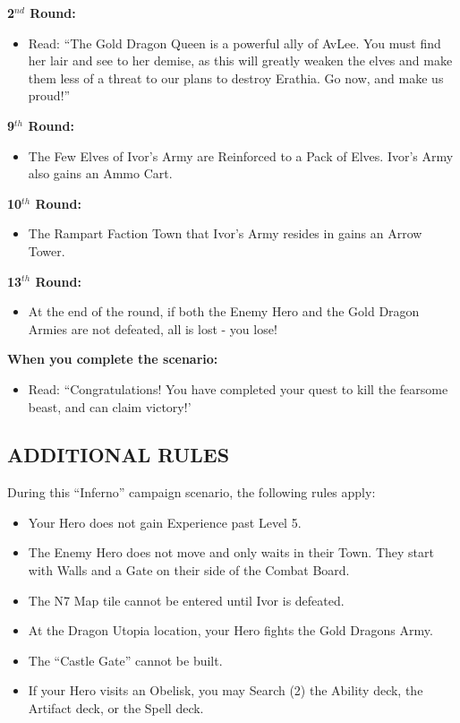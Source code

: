 \begin{multicols*}{2}
\textbf{2$^{nd}$ Round:}
\begin{itemize}
  \item Read: ``The Gold Dragon Queen is a powerful ally of AvLee.
    You must find her lair and see to her demise, as this will greatly weaken
    the elves and make them less of a threat to our plans to destroy Erathia.
    Go now, and make us proud!''
\end{itemize}

\textbf{9$^{th}$ Round:}
\begin{itemize}
  \item The Few Elves of Ivor's Army are Reinforced to a Pack of Elves.
    Ivor's Army also gains an Ammo Cart.
\end{itemize}

\textbf{10$^{th}$ Round:}
\begin{itemize}
  \item The Rampart Faction Town that Ivor's Army resides in gains an Arrow Tower.
\end{itemize}

\textbf{13$^{th}$ Round:}
\begin{itemize}
  \item At the end of the round, if both the Enemy Hero and the Gold Dragon Armies are not defeated, all is lost - you lose!
\end{itemize}

\textbf{When you complete the scenario:}
\begin{itemize}
  \item Read: ``Congratulations! You have completed your quest to kill the fearsome beast, and can claim victory!'
\end{itemize}


\subsection*{\MakeUppercase{Additional rules}}

During this ``Inferno'' campaign scenario, the following rules apply:

\begin{itemize}
    \item Your Hero does not gain Experience past Level 5.
    \item The Enemy Hero does not move and only waits in their Town. They start with Walls and a Gate on their side of the Combat Board.
    \item The N7 Map tile cannot be entered until Ivor is defeated.
    \item At the Dragon Utopia location, your Hero fights the Gold Dragons Army.
    \item The ``Castle Gate'' cannot be built.
    \item If your Hero visits an Obelisk, you may Search (2) the Ability deck, the Artifact deck, or the Spell deck.
\end{itemize}

\end{multicols*}

